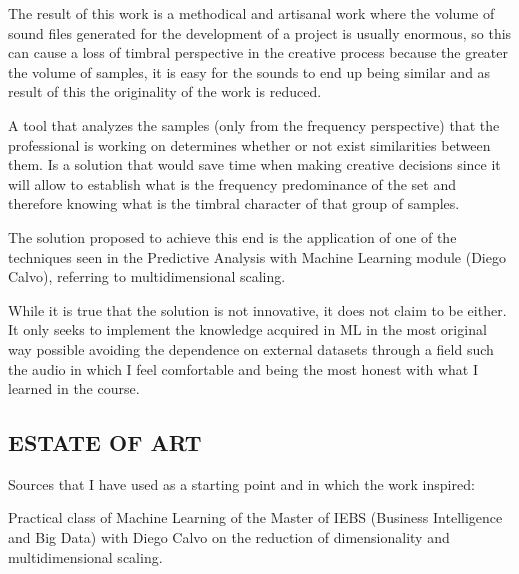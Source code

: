 \documentclass[
]{article}
\begin{document}
\vspace{6pt}

The result of this work is a methodical and artisanal work where the
volume of sound files generated for the development of a project is
usually enormous, so this can cause a loss of timbral perspective in the
creative process because the greater the volume of samples, it is easy
for the sounds to end up being similar and as result of this the
originality of the work is reduced.

\vspace{6pt}

A tool that analyzes the samples (only from the frequency perspective)
that the professional is working on determines whether or not exist
similarities between them. Is a solution that would save time when
making creative decisions since it will allow to establish what is the
frequency predominance of the set and therefore knowing what is the
timbral character of that group of samples.

\vspace{6pt}

The solution proposed to achieve this end is the application of one of
the techniques seen in the Predictive Analysis with Machine Learning
module (Diego Calvo), referring to multidimensional scaling.

While it is true that the solution is not innovative, it does not claim
to be either. It only seeks to implement the knowledge acquired in ML in
the most original way possible avoiding the dependence on external
datasets through a field such the audio in which I feel comfortable and
being the most honest with what I learned in the course.

\newpage

\hypertarget{estate-of-art}{%
\subsection{ESTATE OF ART}\label{estate-of-art}}

\vspace{30pt}

Sources that I have used as a starting point and in which the work
inspired:

\vspace{15pt}

Practical class of Machine Learning of the Master of IEBS (Business
Intelligence and Big Data) with Diego Calvo on the reduction of
dimensionality and multidimensional scaling.
\end{document}
